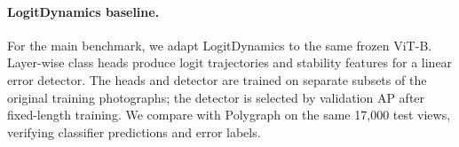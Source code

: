 \documentclass[11pt]{article}
\begin{document}
\paragraph{LogitDynamics baseline.}
For the main benchmark, we adapt LogitDynamics \citep{Beigelman2026}
to the same frozen ViT-B. Layer-wise class heads produce logit
trajectories and stability features for a linear error detector.
The heads and detector are trained on separate subsets of the original
training photographs; the detector is selected by validation AP after
fixed-length training. We compare with Polygraph on the same 17,000
test views, verifying classifier predictions and error labels.



\end{document}
